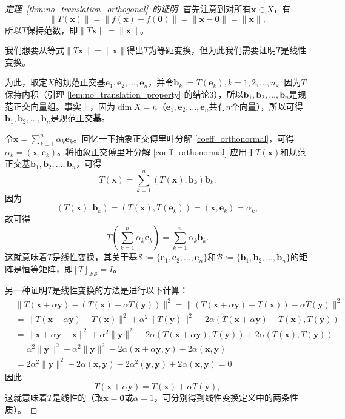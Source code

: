 \begin{proof}[定理~\ref{thm:no_translation_orthogonal}~的证明]
    首先注意到对所有$\mathbf{x}\in X$，有\[\|T(\mathbf{x})\|=\|f(\mathbf{x})-f(\mathbf{0})\|=\|\mathbf{x}-\mathbf{0}\|=\|\mathbf{x}\|,\]
    所以$T$保持范数，即$\|T\mathbf{x}\|=\|\mathbf{x}\|$。

    我们想要从等式$\|T\mathbf{x}\|=\|\mathbf{x}\|$得出$T$为等距变换，但为此我们需要证明$T$是线性变换。

    为此，取定$X$的规范正交基$\mathbf{e}_{1},\mathbf{e}_{2},\ldots,\mathbf{e}_{n}$，并令$\mathbf{b}_k:=T(\mathbf{e}_k),k=1,2,\dots,n$。因为$T$保持内积（引理 \ref{lem:no_translation_property} 的结论3），所以$\mathbf{b}_1,\mathbf{b}_2,\ldots,\mathbf{b}_n$是规范正交向量组。事实上，因为$\dim X=n$（$\mathbf{e}_{1},\mathbf{e}_{2},\ldots,\mathbf{e}_{n}$共有$n$个向量），所以可得$\mathbf{b}_1,\mathbf{b}_2,\ldots,\mathbf{b}_n$是规范正交{\bf 基}。

    令$\mathbf{x}=\sum_{k=1}^{n}\alpha_{k}\mathbf{e}_{k}$。回忆一下抽象正交傅里叶分解 \eqref{coeff_orthonormal}，可得$\alpha_k=(\mathbf{x},\mathbf{e}_k)$。将抽象正交傅里叶分解 \eqref{coeff_orthonormal} 应用于$T(\mathbf{x})$和规范正交基$\mathbf{b}_1,\mathbf{b}_2,\ldots,\mathbf{b}_n$，可得\[T(\mathbf{x})=\sum_{k=1}^n(T(\mathbf{x}),\mathbf{b}_k)\mathbf{b}_k.\]
    因为\[(T(\mathbf{x}),\mathbf{b}_k)=(T(\mathbf{x}),T(\mathbf{e}_k))=(\mathbf{x},\mathbf{e}_k)=\alpha_k,\]
    故可得\[T\left(\sum_{k=1}^n\alpha_k\mathbf{e}_k\right)=\sum_{k=1}^n\alpha_k\mathbf{b}_k.\]
    这就意味着$T$是线性变换，其关于基$\mathcal{S}:=\{\mathbf{e}_{1},\mathbf{e}_{2},\ldots,\mathbf{e}_{n}\}$和$\mathcal{B}:=\{\mathbf{b}_{1},\mathbf{b}_{2},\ldots,\mathbf{b}_{n}\}$的矩阵是恒等矩阵，即$[T]_{\mathcal{B}\mathcal{S}}=I$。

    另一种证明$T$是线性变换的方法是进行以下计算：
    \[\begin{aligned}
        &\|T(\mathbf{x}+\alpha\mathbf{y})-(T(\mathbf{x})+\alpha T(\mathbf{y}))\|^{2}=\|(T(\mathbf{x}+\alpha\mathbf{y})-T(\mathbf{x}))-\alpha T(\mathbf{y})\|^{2}\\
        &=\|T(\mathbf{x}+\alpha\mathbf{y})-T(\mathbf{x})\|^2+\alpha^2\|T(\mathbf{y})\|^2-2\alpha(T(\mathbf{x}+\alpha\mathbf{y})-T(\mathbf{x}),T(\mathbf{y}))\\
        &=\|\mathbf{x}+\alpha\mathbf{y}-\mathbf{x}\|^2+\alpha^2\|\mathbf{y}\|^2-2\alpha(T(\mathbf{x}+\alpha\mathbf{y}),T(\mathbf{y}))+2\alpha(T(\mathbf{x}),T(\mathbf{y}))\\
        &=\alpha^2\|\mathbf{y}\|^2+\alpha^2\|\mathbf{y}\|^2-2\alpha(\mathbf{x}+\alpha\mathbf{y},\mathbf{y})+2\alpha(\mathbf{x},\mathbf{y})\\
        &=2\alpha^2\|\mathbf{y}\|^2-2\alpha(\mathbf{x},\mathbf{y})-2\alpha^2(\mathbf{y},\mathbf{y})+2\alpha(\mathbf{x},\mathbf{y})=0
    \end{aligned}\]
    因此\[T(\mathbf{x}+\alpha\mathbf{y})=T(\mathbf{x})+\alpha T(\mathbf{y}),\]
    这就意味着$T$是线性的（取$\mathbf{x}=\mathbf{0}$或$\alpha=1$，可分别得到线性变换定义中的两条性质）。


\end{proof}
